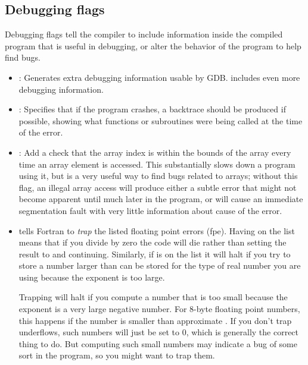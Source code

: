 \documentclass[letterpaper,10pt,english]{sphinxmanual}
\begin{document}
\subsection{Debugging flags}
\label{gfortran_flags:debugging-flags}
Debugging flags tell the compiler to include information inside the
compiled program that is useful in debugging, or alter the behavior of
the program to help find bugs.
\begin{itemize}
\item {} 
: Generates extra debugging information usable by GDB.
 includes even more debugging information.

\item {} 
: Specifies that if the program crashes, a backtrace
should be produced if possible, showing what functions or
subroutines were being called at the time of the error.

\item {} 
: Add a check that the array index is within the
bounds of the array every time an array element is accessed.  This
substantially slows down a program using it, but is a very useful
way to find bugs related to arrays; without this flag, an illegal
array access will produce either a subtle error that might not
become apparent until much later in the program, or will cause an
immediate segmentation fault with very little information about
cause of the error.

\item {} 
 tells Fortran to \emph{trap} the listed
floating point errors (fpe).  Having  on the list means that
if you divide by zero the code will die rather than setting the result to
 and continuing.  Similarly, if  is on the list it
will halt if you try to store a number larger than can be stored for the
type of real number you are using because the exponent is too large.

Trapping  will halt if you compute a number that is too small
because the exponent is a very large negative number.  For 8-byte
floating point numbers, this happens if the number is smaller than
approximate .   If you don't trap underflows, such numbers will
just be set to 0, which is generally the correct thing to do.  But
computing such small numbers may indicate a bug of some sort in the
program, so you might want to trap them.

\end{itemize}
\end{document}
